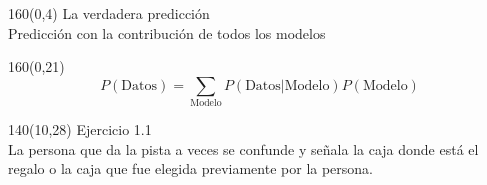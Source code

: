 \documentclass[shownotes,aspectratio=169]{beamer}
\begin{document}
\begin{frame}[plain]
\begin{textblock}{160}(0,4)
\centering \LARGE  La verdadera predicción \\
\large Predicción con la contribución de todos los modelos
\end{textblock}


\begin{textblock}{160}(0,21)
\begin{equation*}
P(\text{Datos}) =  \sum_{\text{Modelo}} P(\text{Datos}|\text{Modelo}) P(\text{Modelo})
\end{equation*}
\end{textblock}

%



\end{frame}







\begin{frame}[plain]


\begin{textblock}{140}(10,28)
\Large Ejercicio 1.1 \\[0.4cm]

\large La persona que da la pista a veces se confunde y señala la caja donde está el regalo o la caja que fue elegida previamente por la persona. \\[0.2cm]


\end{textblock}


\end{frame}
\end{document}
